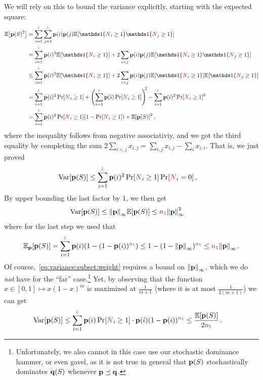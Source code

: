We will rely on this to bound the variance explicitly, starting with the expected square:
\begin{align*}
  \expect{\p(S)^2} 
  &= \sum_{i=1}^\ab\sum_{j=1}^\ab \p(i)\p(j) \bEE{\indic{\occur_i \geq 1}\indic{\occur_j \geq 1}} \\
  &= \sum_{i=1}^\ab\p(i)^2 \bEE{\indic{\occur_i \geq 1}} + 2\sum_{i< j} \p(i)\p(j) \bEE{\indic{\occur_i \geq 1}\indic{\occur_j \geq 1}} \\
  &\leq \sum_{i=1}^\ab\p(i)^2 \bEE{\indic{\occur_i \geq 1}} + 2\sum_{i< j} \p(i)\p(j) \bEE{\indic{\occur_i \geq 1}}\bEE{\indic{\occur_j \geq 1}} \\
  &= \sum_{i=1}^\ab\p(i)^2 \bPr{\occur_i \geq 1} + \Paren{\sum_{i=1}^\ab \p(i)\bPr{\occur_i \geq 1} }^{\!\!2} - \sum_{i=1}^\ab\p(i)^2 \bPr{\occur_i \geq 1}^2 \\
  &= \sum_{i=1}^\ab\p(i)^2 \bPr{\occur_i \geq 1}(1-\bPr{\occur_i \geq 1}) + \expect{\p(S)}^2\,,
\end{align*}
where the inequality follows from negative associativiy, and we got the third equality by completing the sum $2\sum_{i<j} x_{i,j} = \sum_{i,j} x_{i,j} - \sum_{i} x_{i,i}$. That is, we just proved
\begin{align}
  \Var[\p(S)]
  &\leq \sum_{i=1}^\ab\p(i)^2 \bPr{\occur_i \geq 1}\bPr{\occur_i = 0}\,.
\end{align}
By upper bounding the last factor by $1$, we then get
\begin{align}
  \Var[\p(S)]
  &\leq \norminf{\p}\expect{\p(S)} \leq \nss\norminf{\p}^2\, \label{eq:variance:subset:weight}
\end{align}
where for the last step we used that
\[
\bE{\p}{\p(S)} = \sum_{i=1}^\ab \p(i) (1-(1-\p(i))^{\nss}) %
\leq 1-(1-\norminf{\p})^{\nss}
\leq \nss\norminf{\p}\,.
\]
Of course,~\cref{eq:variance:subset:weight} requires a bound on $\norminf{\p}$, which we do \emph{not} have for the ``far'' case.\footnote{Unfortunately, we also cannot in this case use our stochastic dominance hammer, or even gavel, as it is not true in general that $\mathbf{p}(S)$ stochastically dominates $\mathbf{q}(S)$ whenever $\mathbf{p}\preceq\mathbf{q}$.} Yet, by observing that the function $x\in[0,1]\mapsto x(1-x)^m$ is maximized at $\frac{1}{m+1}$ (where it is at most $\frac{1}{2(m+1)}$) we can get
\begin{align}
  \Var[\p(S)]
  &\leq \sum_{i=1}^\ab\p(i) \bPr{\occur_i \geq 1} \cdot \p(i) (1-\p(i))^{\nss}
  \leq \frac{\expect{\p(S)}}{2\nss}\,.
\end{align}

